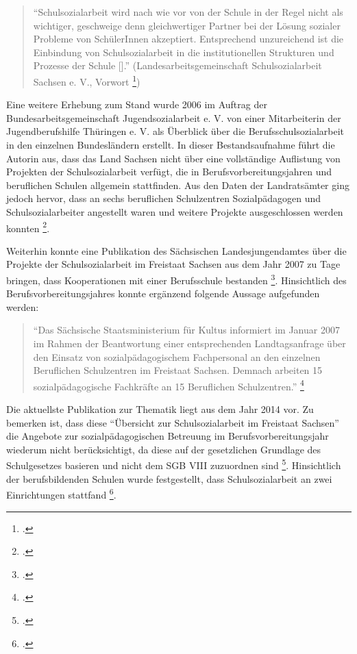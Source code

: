 \begin{quotation}
\noindent
	"`Schulsozialarbeit wird nach wie vor von der Schule in der Regel nicht als wichtiger, geschweige denn gleichwertiger Partner bei der Lösung sozialer Probleme von SchülerInnen akzeptiert. Entsprechend unzureichend ist die Einbindung von Schulsozialarbeit in die institutionellen Strukturen und Prozesse der Schule [\punkte]."' (Landesarbeitsgemeinschaft Schulsozialarbeit Sachsen e. V., Vorwort \footcite[vgl.]{LSS2004})
\end{quotation}

\noindent
Eine weitere Erhebung zum Stand wurde 2006 im Auftrag der Bundesarbeitsgemeinschaft Jugendsozialarbeit e. V. von einer Mitarbeiterin der Jugendberufshilfe Thüringen e. V. als Überblick über die Berufsschulsozialarbeit in den einzelnen Bundesländern erstellt. In dieser Bestandsaufnahme führt die Autorin aus, dass das Land Sachsen nicht über eine vollständige Auflistung von Projekten der Schulsozialarbeit verfügt, die in Berufsvorbereitungsjahren und beruflichen Schulen allgemein stattfinden. Aus den Daten der Landratsämter ging jedoch hervor, dass an sechs beruflichen Schulzentren Sozialpädagogen und Schulsozialarbeiter angestellt waren und weitere Projekte ausgeschlossen werden konnten \footcite[vgl.][28]{Lassmann2006}.

Weiterhin konnte eine Publikation des Sächsischen Landesjungendamtes über die Projekte der Schulsozialarbeit im Freistaat Sachsen aus dem Jahr 2007 zu Tage bringen, dass Kooperationen mit einer Berufsschule bestanden \footcite[vgl.][4]{SLFS2007}. Hinsichtlich des Berufsvorbereitungsjahres konnte ergänzend folgende Aussage aufgefunden werden: 

\begin{quotation}
\noindent
	"`Das Sächsische Staatsministerium für Kultus informiert im Januar 2007 im Rahmen der Beantwortung einer entsprechenden Landtagsanfrage über den Einsatz von sozialpädagogischem Fachpersonal an den einzelnen Beruflichen Schulzentren im Freistaat Sachsen. Demnach arbeiten 15 sozialpädagogische Fachkräfte an 15 Beruflichen Schulzentren."' \footcite[vgl.][13]{SLFS2007}
\end{quotation}

\noindent
Die aktuellste Publikation zur Thematik liegt aus dem Jahr 2014 vor. Zu bemerken ist, dass diese "`Übersicht zur Schulsozialarbeit im Freistaat Sachsen"' die Angebote zur sozialpädagogischen Betreuung im Berufsvorbereitungsjahr wiederum nicht berücksichtigt, da diese auf der gesetzlichen Grundlage des Schulgesetzes basieren und nicht dem SGB VIII zuzuordnen sind \footcite[vgl.][3]{SMSSSV2014}. Hinsichtlich der berufsbildenden Schulen wurde festgestellt, dass Schulsozialarbeit an zwei Einrichtungen stattfand \footcite[vgl.][5]{SMSSSV2014}. 

